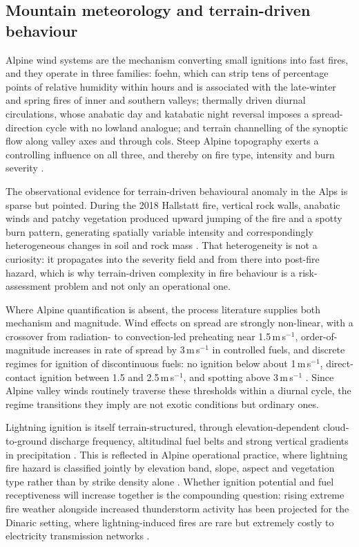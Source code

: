 \documentclass[11pt,a4paper]{article}
\begin{document}
\subsection{Mountain meteorology and terrain-driven behaviour}

Alpine wind systems are the mechanism converting small ignitions into fast fires, and they operate in three families: foehn, which can strip tens of percentage points of relative humidity within hours and is associated with the late-winter and spring fires of inner and southern valleys; thermally driven diurnal circulations, whose anabatic day and katabatic night reversal imposes a spread-direction cycle with no lowland analogue; and terrain channelling of the synoptic flow along valley axes and through cols. Steep Alpine topography exerts a controlling influence on all three, and thereby on fire type, intensity and burn severity \citep{melzner_wildfire-induced_2025}.

The observational evidence for terrain-driven behavioural anomaly in the Alps is sparse but pointed. During the 2018 Hallstatt fire, vertical rock walls, anabatic winds and patchy vegetation produced upward jumping of the fire and a spotty burn pattern, generating spatially variable intensity and correspondingly heterogeneous changes in soil and rock mass \citep{melzner_brief_2019}. That heterogeneity is not a curiosity: it propagates into the severity field and from there into post-fire hazard, which is why terrain-driven complexity in fire behaviour is a risk-assessment problem and not only an operational one.

Where Alpine quantification is absent, the process literature supplies both mechanism and magnitude. Wind effects on spread are strongly non-linear, with a crossover from radiation- to convection-led preheating near 1.5\,m\,s$^{-1}$, order-of-magnitude increases in rate of spread by 3\,m\,s$^{-1}$ in controlled fuels, and discrete regimes for ignition of discontinuous fuels: no ignition below about 1\,m\,s$^{-1}$, direct-contact ignition between 1.5 and 2.5\,m\,s$^{-1}$, and spotting above 3\,m\,s$^{-1}$ \citep{hayajneh_wind_2026}. Since Alpine valley winds routinely traverse these thresholds within a diurnal cycle, the regime transitions they imply are not exotic conditions but ordinary ones.

Lightning ignition is itself terrain-structured, through elevation-dependent cloud-to-ground discharge frequency, altitudinal fuel belts and strong vertical gradients in precipitation \citep{baranovskiy_deterministic_2021}. This is reflected in Alpine operational practice, where lightning fire hazard is classified jointly by elevation band, slope, aspect and vegetation type rather than by strike density alone \citep{muller_towards_2020}. Whether ignition potential and fuel receptiveness will increase together is the compounding question: rising extreme fire weather alongside increased thunderstorm activity has been projected for the Dinaric setting, where lightning-induced fires are rare but extremely costly to electricity transmission networks \citep{kyriakopoulos_impact_2023}.
\end{document}
